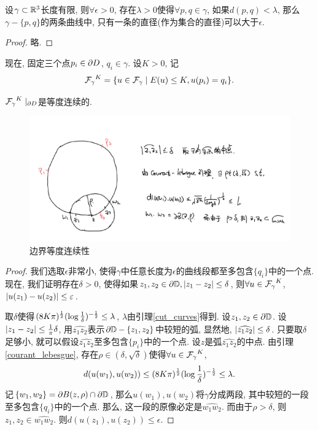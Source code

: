 \begin{lemma}\label{cut_curves}
    设$\gamma \subset \R^3$长度有限, 则$\forall \epsilon > 0$, 存在$\lambda>0$使得$\forall p,q \in \gamma$, 如果$d(p,q)< \lambda$, 那么$\gamma-\{p,q\}$的两条曲线中, 只有一条的直径(作为集合的直径)可以大于$\epsilon$. 
\end{lemma}
\begin{proof}
    略.
\end{proof}
现在, 固定三个点$p_i \in \P D$, $q_i \in \gamma$. 设$K > 0$, 记
\begin{equation}
    \FG^K=\{u \in \FG\mid E(u) \le K, u(p_i)=q_i\}.
\end{equation}
\begin{lemma} \label{boundary_equicontinuous}
    $\FG^K\mid_{\P D}$是等度连续的.
\end{lemma}
\begin{figure}[ht]
    \centering
    \includegraphics[scale=0.5]{images/courant_lebesgue.png}
    \caption{边界等度连续性}
    \label{equi_continuous}
\end{figure}
\begin{proof}
    我们选取$\epsilon$非常小, 使得$\gamma$中任意长度为$\epsilon$的曲线段都至多包含$\{q_i\}$中的一个点. 现在, 我们证明存在$\delta>0$, 使得如果$z_1,z_2 \in \P \D, \abs{z_1-z_2} \le \delta$, 则$\forall u \in \FG^K$, $\abs{u(z_1)-u(z_2)} \le \epsilon$.  
    \par 取$\delta$使得$(8K\pi)^{\rec{2}}(\log \rec{\delta})^{-\rec{2}} \le \lambda$, $\lambda$由引理\eqref{cut_curves}得到.  设$z_1,z_2 \in \P \D$.  设$\abs{z_1-z_2} \le \rec{\pi} \delta$, 用$\widehat{z_1z_2}$表示$\P \D - \{z_1,z_2\}$中较短的弧, 显然地, $\abs{\widehat{z_1z_2}} \le \delta$. 只要取$\delta$足够小, 就可以假设$\widehat{z_1z_2}$至多包含$\{p_i\}$中的一个点. 设$z$是弧$\widehat{z_1z_2}$的中点. 由引理\eqref{courant_lebesgue}, 存在$\rho \in (\delta, \sqrt{\delta})$使得$\forall u \in \FG^K$, 
    \begin{equation}
        d(u(w_1),u(w_2)) \le (8K\pi)^{\rec{2}}(\log \rec{\delta})^{-\rec{2}} \le \lambda.
    \end{equation}
    记$\{w_1,w_2\} = \P B(z,\rho) \cap \P \D$, 那么$u(w_1), u(w_2)$将$\gamma$分成两段, 其中较短的一段至多包含$\{q_i\}$中的一个点. 那么, 这一段的原像必定是$\widehat{w_1w_2}$.  而由于$\rho > \delta$, 则$z_1,z_2 \in \widehat{w_1w_2}$. 则$d(u(z_1),u(z_2)) \le \epsilon$.
\end{proof}
